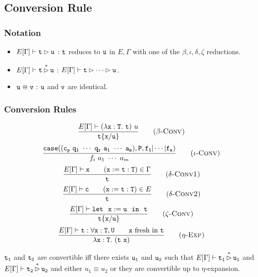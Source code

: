 \subsection{Conversion Rule}

\subsubsection{Notation}
\begin{itemize}
    \item $E[\Gamma]\vdash \tt t\rhd u$ : $\tt t$ reduces to $\tt u$ in $E,\Gamma$ with 
    one of the $\beta,\iota,\delta,\zeta$ reductions.
    \item $E[\Gamma]\vdash \tt t\mathop{\rhd}\limits^* u$ : $E[\Gamma]\vdash\tt t\rhd\cdots\rhd u$.
    \item $\tt u\equiv v$ : $\tt u$ and $\tt v$ are identical.
\end{itemize}

\subsubsection{Conversion Rules}
\begin{equation*}
\frac{E[\Gamma]\vdash(\lambda{\tt x:T.\ t})\ u}
    {\tt t\{x/u\}}
    \tag{\sc $\beta$-Conv}
\end{equation*}
\begin{equation*}
\frac{\tt case((c_p\ q_1\ \cdots\ q_r\ a_1\ \cdots\ a_m),P,f_1|\cdots|f_n)}
    {f_i\ a_1\ \cdots\ a_m}
    \tag{\sc $\iota$-Conv}
\end{equation*}
\begin{equation*}
\frac{E[\Gamma]\vdash{\tt x}\qquad ({\tt x:=t:T})\in\Gamma}
    {\tt t}
    \tag{\sc $\delta$-Conv1}
\end{equation*}
\begin{equation*}
\frac{E[\Gamma]\vdash{\tt c}\qquad ({\tt x:=t:T})\in E}
    {\tt t}
    \tag{\sc $\delta$-Conv2}
\end{equation*}
\begin{equation*}
\frac{E[\Gamma]\vdash \tt let\ \ x:=u\ \ in\ \ t}
    {\tt t\{x/u\}}
    \tag{\sc $\zeta$-Conv}
\end{equation*}
\begin{equation*}
\frac{E[\Gamma]\vdash \tt t:\forall x:T,U\qquad x\text{ fresh in }t}
    {\tt \lambda\tt x:T.\ (t\ x)}
    \tag{\sc $\eta$-Exp}
\end{equation*}

\begin{Def}[Convertibility]
$\tt t_1$ and $\tt t_2$ are convertible iff there exists $\tt u_1$ and $\tt u_2$ such that 
$E[\Gamma]\vdash \tt t_1\mathop{\rhd}\limits^* u_1$ and $E[\Gamma]\vdash \tt t_2\mathop{\rhd}\limits^* u_2$ 
and either $u_1\equiv u_2$ or they are convertible up to $\eta$-expansion.
\end{Def}


